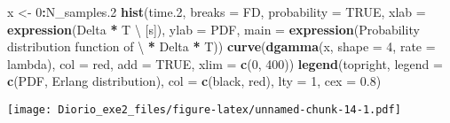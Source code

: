 \documentclass[
]{article}
\newenvironment{Shaded}{\begin{snugshade}}{\end{snugshade}}
\newcommand{\AttributeTok}[1]{\textcolor[rgb]{0.13,0.29,0.53}{#1}}
\newcommand{\ConstantTok}[1]{\textcolor[rgb]{0.56,0.35,0.01}{#1}}
\newcommand{\DecValTok}[1]{\textcolor[rgb]{0.00,0.00,0.81}{#1}}
\newcommand{\FloatTok}[1]{\textcolor[rgb]{0.00,0.00,0.81}{#1}}
\newcommand{\FunctionTok}[1]{\textcolor[rgb]{0.13,0.29,0.53}{\textbf{#1}}}
\newcommand{\NormalTok}[1]{#1}
\newcommand{\OtherTok}[1]{\textcolor[rgb]{0.56,0.35,0.01}{#1}}
\newcommand{\SpecialCharTok}[1]{\textcolor[rgb]{0.81,0.36,0.00}{\textbf{#1}}}
\newcommand{\StringTok}[1]{\textcolor[rgb]{0.31,0.60,0.02}{#1}}
\begin{document}
\begin{Shaded}
\begin{Highlighting}[]
\NormalTok{x }\OtherTok{\textless{}{-}} \DecValTok{0}\SpecialCharTok{:}\NormalTok{N\_samples}\FloatTok{.2}
\FunctionTok{hist}\NormalTok{(time}\FloatTok{.2}\NormalTok{, }\AttributeTok{breaks =} \StringTok{\textquotesingle{}FD\textquotesingle{}}\NormalTok{,}
     \AttributeTok{probability =} \ConstantTok{TRUE}\NormalTok{, }\AttributeTok{xlab =} \FunctionTok{expression}\NormalTok{(Delta }\SpecialCharTok{*} \StringTok{\textquotesingle{}T \textbackslash{} [s]\textquotesingle{}}\NormalTok{), }\AttributeTok{ylab =} \StringTok{\textquotesingle{}PDF\textquotesingle{}}\NormalTok{, }
     \AttributeTok{main =} \FunctionTok{expression}\NormalTok{(}\StringTok{\textquotesingle{}Probability distribution function of \textbackslash{} \textquotesingle{}} \SpecialCharTok{*}\NormalTok{ Delta }\SpecialCharTok{*} \StringTok{\textquotesingle{}T\textquotesingle{}}\NormalTok{))}
\FunctionTok{curve}\NormalTok{(}\FunctionTok{dgamma}\NormalTok{(x, }\AttributeTok{shape =} \DecValTok{4}\NormalTok{, }\AttributeTok{rate =}\NormalTok{ lambda), }\AttributeTok{col =} \StringTok{\textquotesingle{}red\textquotesingle{}}\NormalTok{, }\AttributeTok{add =} \ConstantTok{TRUE}\NormalTok{, }\AttributeTok{xlim =} \FunctionTok{c}\NormalTok{(}\DecValTok{0}\NormalTok{, }\DecValTok{400}\NormalTok{))}
\FunctionTok{legend}\NormalTok{(}\StringTok{\textquotesingle{}topright\textquotesingle{}}\NormalTok{, }\AttributeTok{legend =} \FunctionTok{c}\NormalTok{(}\StringTok{\textquotesingle{}PDF\textquotesingle{}}\NormalTok{, }\StringTok{\textquotesingle{}Erlang distribution\textquotesingle{}}\NormalTok{),}
       \AttributeTok{col =} \FunctionTok{c}\NormalTok{(}\StringTok{\textquotesingle{}black\textquotesingle{}}\NormalTok{, }\StringTok{\textquotesingle{}red\textquotesingle{}}\NormalTok{), }\AttributeTok{lty =} \DecValTok{1}\NormalTok{, }\AttributeTok{cex =} \FloatTok{0.8}\NormalTok{)}
\end{Highlighting}
\end{Shaded}

\texttt{[image: Diorio\_exe2\_files/figure-latex/unnamed-chunk-14-1.pdf]}
\end{document}
